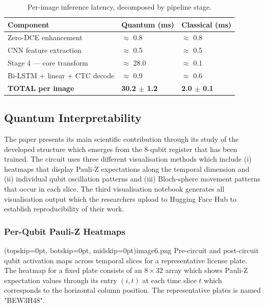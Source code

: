 \documentclass{ieeeaccess}
\begin{document}
\begin{table}[h]
\centering
\caption{Per-image inference latency, decomposed by pipeline stage.}
\label{tab:latency}
\begin{tabularx}{\columnwidth}{@{}lXX@{}}
\toprule
\textbf{Component} & \textbf{Quantum (ms)} & \textbf{Classical (ms)} \\
\midrule
Zero-DCE enhancement & $\approx$ 0.8 & $\approx$ 0.8 \\
CNN feature extraction & $\approx$ 0.5 & $\approx$ 0.5 \\
Stage 4 — core transform & $\approx$ 28.0 & $\approx$ 0.1 \\
Bi-LSTM + linear + CTC decode & $\approx$ 0.9 & $\approx$ 0.6 \\
\textbf{TOTAL per image} & \textbf{30.2 $\pm$ 1.2} & \textbf{2.0 $\pm$ 0.1} \\
\bottomrule
\end{tabularx}
\end{table}

\subsection{Quantum Interpretability}
The paper presents its main scientific contribution through its study of the developed structure which emerges from the 8-qubit register that has been trained. The circuit uses three different visualisation methods which include (i) heatmaps that display Pauli-Z expectations along the temporal dimension and (ii) individual qubit oscillation patterns and (iii) Bloch-sphere movement patterns that occur in each slice. The third visualisation notebook generates all visualisation output which the researchers upload to Hugging Face Hub to establish reproducibility of their work.

\subsubsection{Per-Qubit Pauli-Z Heatmaps}
\Figure[htbp](topskip=0pt, botskip=0pt, midskip=0pt){image6.png}
{Pre-circuit and post-circuit qubit activation maps across temporal slices for a representative license plate.\label{fig:heatmaps}}
The heatmap for a fixed plate consists of an $8 \times 32$ array which shows Pauli-Z expectation values through its entry $(i, t)$ at each time slice $t$ which corresponds to the horizontal column position. The representative plates is named "BEW3H48". 
\end{document}
